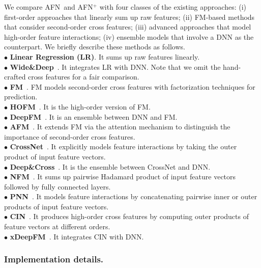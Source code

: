 \documentclass[letterpaper]{article} \usepackage{aaai20}  \usepackage{times}  \usepackage{helvet} \usepackage{courier}  \usepackage[hyphens]{url}  \usepackage{graphicx} \urlstyle{rm} \def\UrlFont{\rm}  \usepackage{graphicx}  \frenchspacing  \setlength{\pdfpagewidth}{8.5in}  \setlength{\pdfpageheight}{11in}
\newcommand{\model}{{AFN}~}
\newcommand{\modelns}{{AFN}}
\begin{document}
We compare \model and \modelns$^+$ with four classes of the existing approaches: (i) first-order approaches that linearly sum up raw features; (ii) FM-based methods that consider second-order cross features; (iii) advanced approaches that model high-order feature interactions; (iv) ensemble models that involve a DNN as the counterpart. We briefly describe these methods as follows. \\
{$\bullet$ \bf Linear Regression (LR)}. It sums up raw features linearly. \\
{$\bullet$ \bf Wide\&Deep}~\cite{wide_and_deep}. It integrates LR with DNN. Note that we omit the hand-crafted cross features for a fair comparison.\\
{$\bullet$ \bf FM}~\cite{libFM}. FM models second-order cross features with factorization techniques for prediction. \\
{$\bullet$ \bf HOFM}~\cite{hofm}. It is the high-order version of FM.\\
{$\bullet$ \bf DeepFM}~\cite{DeepFM}. It is an ensemble between DNN and FM.\\
{$\bullet$ \bf AFM}~\cite{AFM}. It extends FM via the attention mechanism to distinguish the importance of second-order cross features. \\ 
{$\bullet$ \bf CrossNet}~\cite{deep_and_cross}. It explicitly models feature interactions by taking the outer product of input feature vectors.\\
{$\bullet$ \bf Deep\&Cross}~\cite{deep_and_cross}. It is the ensemble between CrossNet and DNN. \\
{$\bullet$ \bf NFM}~\cite{nfm}. It sums up pairwise Hadamard product of input feature vectors followed by fully connected layers. \\
{$\bullet$ \bf PNN}~\cite{pnn}. It models feature interactions by concatenating pairwise inner or outer products of input feature vectors. \\ 
{$\bullet$ \bf CIN}~\cite{xDeepFM}. It produces high-order cross features by computing outer products of feature vectors at different orders.\\
{$\bullet$ \bf xDeepFM}~\cite{xDeepFM}. It integrates CIN with DNN.
 
\subsubsection{Implementation details.}
\end{document}
